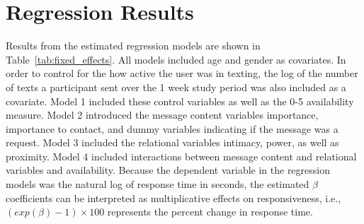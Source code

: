 \documentclass[12pt]{nuthesis}	%
\begin{document}
\section{Regression Results}

Results from the estimated regression models are shown in Table~\ref{tab:fixed_effects}. All models included age and gender as covariates. In order to control for the how active the user was in texting, the log of the number of texts a participant sent over the 1 week study period was also included as a covariate. Model 1 included these control variables as well as the 0-5 availability measure. Model 2 introduced the message content variables importance, importance to contact, and dummy variables indicating if the message was a request. Model 3 included the relational variables intimacy, power, as well as proximity. Model 4 included interactions between message content and relational variables and availability. Because the dependent variable in the regression models was the natural log of response time in seconds, the estimated $\beta$ coefficients can be interpreted as multiplicative effects on responsiveness, i.e., $(exp(\beta) - 1) \times 100 $ represents the percent change in response time.
\end{document}
